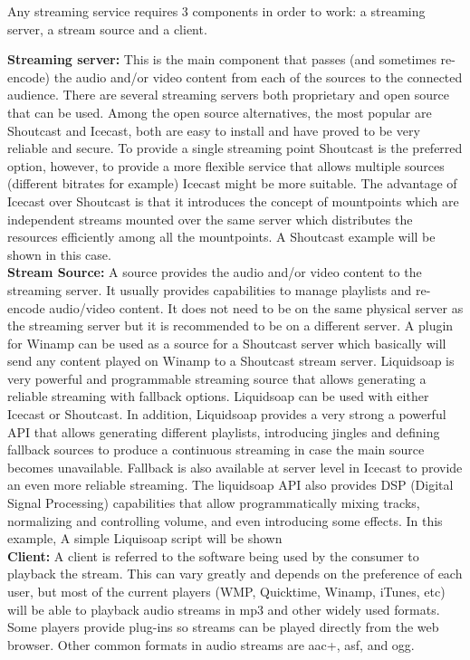Any streaming service requires 3 components in order to work: a streaming server, a stream source and a client.

\textbf{Streaming server:}  This is the main component that passes (and sometimes re-encode) the audio and/or video content from each of the sources to the connected audience. There are several streaming servers both proprietary and open source that can be used. Among the open source alternatives, the most popular are Shoutcast and Icecast, both are easy to install and have proved to be very reliable and secure. To provide a single streaming point Shoutcast is the preferred option, however, to provide a more flexible service that allows multiple sources (different bitrates for example) Icecast might be more suitable. The advantage of Icecast over Shoutcast is that it introduces the concept of mountpoints which are independent streams mounted over the same server which distributes the resources efficiently among all the mountpoints. A Shoutcast example will be shown in this case.\\
\textbf{Stream Source:} A source provides the audio and/or video content to the streaming server. It usually provides capabilities to manage playlists and re-encode audio/video content. It does not need to be on the same physical server as the streaming server but it is recommended to be on a different server. A plugin for Winamp can be used as a source for a Shoutcast server which basically will send any content played on Winamp to a Shoutcast stream server. Liquidsoap is very powerful and programmable streaming source that allows generating a reliable streaming with fallback options. Liquidsoap can be used with either Icecast or Shoutcast. In addition, Liquidsoap provides a very strong a powerful API that allows generating different playlists, introducing jingles and defining fallback sources to produce a continuous streaming in case the main source becomes unavailable. Fallback is also available at server level in Icecast to provide an even more reliable streaming. The liquidsoap API also provides DSP (Digital Signal Processing) capabilities that allow programmatically mixing tracks, normalizing and controlling volume, and even introducing some effects. In this example, A simple Liquisoap script will be shown\\
\textbf{Client:} A client is referred to the software being used by the consumer to playback the stream.  This can vary greatly and depends on the preference of each user, but most of the current players (WMP, Quicktime, Winamp, iTunes, etc) will be able to playback audio streams in mp3 and other widely used formats. Some players provide plug-ins so streams can be played directly from the web browser. Other common formats in audio streams are aac+, asf, and ogg.




